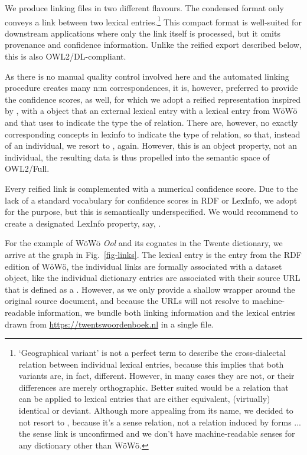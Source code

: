 \documentclass{article}
\newcommand{\word}[1]{\textsl{#1}}
\begin{document}
We produce linking files in two different flavours. The condensed format only conveys a  link between two lexical entries.\footnote{
    `Geographical variant' is not a perfect term to describe the cross-dialectal relation between individual lexical entries, because this implies that both variants are, in fact, different. However, in many cases they are not, or their differences are merely orthographic. Better suited would be a relation that can be applied to lexical entries that are either equivalent, (virtually) identical or deviant. 
    Although more appealing from its name, we decided to not resort to , because it's a sense relation, not a relation induced by forms ... the sense link is unconfirmed and we don't have machine-readable senses for any dictionary other than WöWö.
}
This compact format is well-suited for downstream applications where only the link itself is processed, but it omits provenance and confidence information. Unlike the reified export described below, this is also OWL2/DL-compliant. 

As there is no manual quality control involved here and the automated linking procedure creates many n:m correspondences, it is, however, preferred to provide the confidence scores, as well, for which we adopt a reified representation inspired by \citet{gillis2023refinement}, with a  object that  an external lexical entry with a lexical entry from WöWö and that uses  to indicate the type the of relation. There are, however, no exactly corresponding concepts in lexinfo to indicate the type of relation, so that, instead of an individual, we resort to , again. However, this is an object property, not an individual, the resulting data is thus propelled into the semantic space of OWL2/Full.

Every reified link is complemented with a numerical confidence score. Due to the lack of a standard vocabulary for confidence scores in RDF or LexInfo, we adopt  for the purpose, but this is semantically underspecified. We would recommend to create a designated LexInfo property, say, .

For the example of WöWö \word{Ool} and its cognates in the Twente dictionary, we arrive at the graph in Fig.\ \ref{fig-links}. The lexical entry  is the entry from the RDF edition of WöWö, the individual links are formally associated with a dataset object, like the individual dictionary entries are associated with their source URL that is defined as a . However, as we only provide a shallow wrapper around the original source document, and because the URLs will not resolve to machine-readable information, we bundle both linking information and the lexical entries drawn from \url{https://twentswoordenboek.nl} in a single file.
\end{document}

